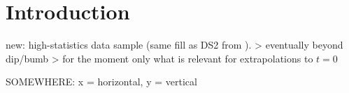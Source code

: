 \section{Introduction}

\> new: high-statistics data sample (same fill as DS2 from \cite{prl111}).
\>> eventually beyond dip/bumb
\>> for the moment only what is relevant for extrapolations to $t=0$

SOMEWHERE: x = horizontal, y = vertical
